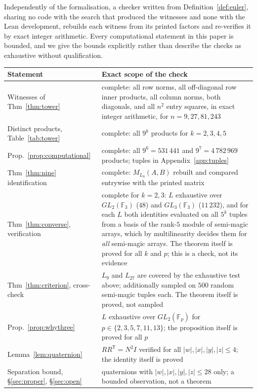 \documentclass[11pt,a4paper]{amsart}
\theoremstyle{plain}
\theoremstyle{definition}
\theoremstyle{remark}
\newcommand{\FF}{\mathbb{F}}
\newcommand{\tr}{\mathsf{T}}
\begin{document}
Independently of the formalisation, a checker written from
Definition~\ref{def:euler}, sharing no code with the search that produced the
witnesses and none with the Lean development, rebuilds each witness from its
printed factors and re-verifies it by exact integer arithmetic. Every
computational statement in this paper is bounded, and we give the bounds
explicitly rather than describe the checks as exhaustive without qualification.

\begin{center}\footnotesize
\begin{tabular}{@{}p{}p{}@{}}
\toprule
Statement & Exact scope of the check\\
\midrule
Witnesses of Thm~\ref{thm:tower} &
  complete: all row norms, all off-diagonal row inner products, all column
  norms, both diagonals, and all $n^2$ entry squares, in exact integer
  arithmetic, for $n=9,27,81,243$\\[2pt]
Distinct products, Table~\ref{tab:tower} &
  complete: all $9^k$ products for $k=2,3,4,5$\\[2pt]
Prop.~\ref{prop:computational} &
  complete: all $9^6=531\,441$ and $9^7=4\,782\,969$ products; tuples in
  Appendix~\ref{app:tuples}\\[2pt]
Thm~\ref{thm:nine} identification &
  complete: $M_{L_9}(A,B)$ rebuilt and compared entrywise with the printed
  matrix\\[2pt]
Thm~\ref{thm:converse}, verification &
  complete for $k=2,3$: $L$ exhaustive over $GL_2(\FF_3)$ ($48$) and
  $GL_3(\FF_3)$ ($11\,232$), and for each $L$ both identities evaluated on all
  $5^k$ tuples from a basis of the rank-$5$ module of semi-magic arrays, which
  by multilinearity decides them for \emph{all} semi-magic arrays. The theorem
  itself is proved for all $k$ and $p$; this is a check, not its evidence\\[2pt]
Thm~\ref{thm:criterion}, cross-check &
  $L_9$ and $L_{27}$ are covered by the exhaustive test above; additionally
  sampled on $500$ random semi-magic tuples each. The theorem itself is proved,
  not sampled\\[2pt]
Prop.~\ref{prop:whythree} &
  $L$ exhaustive over $GL_2(\FF_p)$ for $p\in\{2,3,5,7,11,13\}$; the
  proposition itself is proved for all $p$\\[2pt]
Lemma~\ref{lem:quaternion} &
  $RR^{\tr}=N^2I$ verified for all $|w|,|x|,|y|,|z|\le4$; the identity itself is
  proved\\[2pt]
Separation bound, \S\ref{sec:proper}, \S\ref{sec:open} &
  quaternions with $|w|,|x|,|y|,|z|\le28$ only; a bounded observation, not a
  theorem\\
\bottomrule
\end{tabular}
\end{center}
\end{document}
